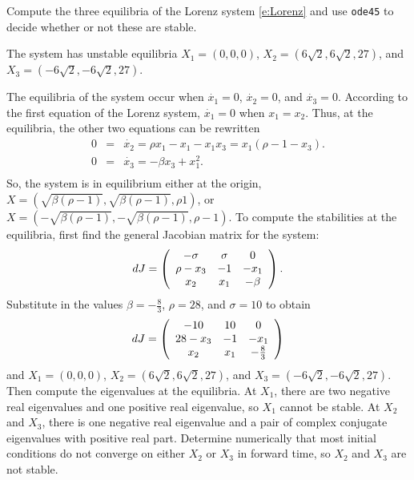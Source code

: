 \documentclass{ximera}
\begin{document}
\begin{exercise} \label{c11.4.1}
Compute the three equilibria of the Lorenz system \eqref{e:Lorenz}
and use {\tt ode45} to decide whether or not these are stable.

\begin{solution}
\ans The system has unstable equilibria $X_1 = (0,0,0)$, 
$X_2 = (6\sqrt{2},6\sqrt{2},27)$, and $X_3 = (-6\sqrt{2},-6\sqrt{2},27)$.

\soln The equilibria of the system occur when $\dot{x_1} = 0$, $\dot{x_2}
= 0$, and $\dot{x_3} = 0$.  According to the first equation of the Lorenz
system, $\dot{x_1} = 0$ when $x_1 = x_2$.  Thus, at the equilibria, the
other two equations can be rewritten
\[
\begin{array}{rcl}
0 & = & \dot{x_2} = \rho x_1 - x_1 - x_1x_3 = x_1(\rho - 1 - x_3). \\
0 & = & \dot{x_3} = -\beta x_3 + x_1^2. \\
\end{array}
\]
So, the system is in equilibrium either at the origin, $X =
(\sqrt{\beta (\rho - 1)}, \sqrt{\beta (\rho - 1)}, \rho 1)$, or
$X = (-\sqrt{\beta (\rho - 1)}, -\sqrt{\beta (\rho - 1)}, \rho - 1)$.
To compute the stabilities at the equilibria, first find the general
Jacobian matrix for the system:
\[
dJ = \left(\begin{array}{ccc} -\sigma & \sigma & 0 \\ \rho - x_3 & -1 & -x_1 \\ x_2 & x_1 & -\beta\end{array}\right).
\]
Substitute in the values $\beta = -\frac{8}{3}$, $\rho = 28$, and $\sigma
= 10$ to obtain
\[
dJ = \left(\begin{array}{ccc} -10 & 10 & 0 \\ 28 - x_3 & -1 & -x_1 \\ x_2 & x_1 & -\frac{8}{3}\end{array}\right)
\]
and $X_1 = (0,0,0)$, $X_2 = (6\sqrt{2},6\sqrt{2},27)$, and
$X_3 = (-6\sqrt{2},-6\sqrt{2},27)$.  Then compute the eigenvalues at the
equilibria.  At $X_1$, there are two negative real eigenvalues and one 
positive real eigenvalue, so $X_1$ cannot be stable.  At $X_2$ and $X_3$,
there is one negative real eigenvalue and a pair of complex conjugate
eigenvalues with positive real part.  Determine numerically that most
initial conditions do not converge on either $X_2$ or $X_3$ in forward time,
so $X_2$ and $X_3$ are not stable.


\end{solution}
\end{exercise}
\end{document}
